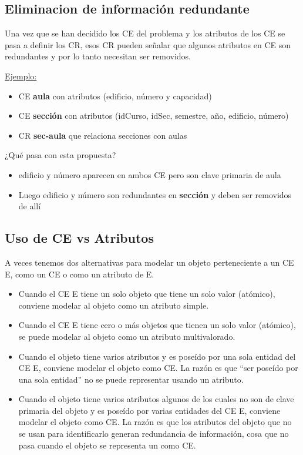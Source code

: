 \documentclass[12pt,a4paper]{report}
\begin{document}
		\subsection{Eliminacion de información redundante}
			Una vez que se han decidido los CE del problema y los atributos de los CE se pasa a definir los CR, esos CR pueden señalar que algunos atributos en CE son redundantes y por lo tanto necesitan ser removidos.
			\vspace{5mm}
			\par \underline{Ejemplo:}
			\begin{itemize}
				\item CE \textbf{aula} con atributos (edificio, número y capacidad)
				\item CE \textbf{sección} con atributos (idCurso, idSec, semestre, año, edificio, número)
				\item CR \textbf{sec-aula} que relaciona secciones con aulas
				\end{itemize}
				
				\par ¿Qué pasa con esta propuesta?
				\begin{itemize}
				\item edificio y número aparecen en ambos CE pero son clave primaria de aula
				\item Luego edificio y número son redundantes en \textbf{sección} y deben ser removidos de allí
				\end{itemize}	

		\subsection{Uso de CE vs Atributos}
			A veces tenemos dos alternativas para modelar un objeto perteneciente a un CE E, como un CE o como un atributo de E.
			\begin{itemize}
				\item Cuando el CE E tiene un solo objeto que tiene un solo valor (atómico), conviene modelar al objeto como un atributo simple.
				\item Cuando el CE E tiene cero o más objetos que tienen un solo valor (atómico), se puede modelar al objeto como un atributo multivalorado.
				
				\item Cuando el objeto tiene varios atributos y es poseído por una sola entidad del CE E, conviene modelar el objeto como CE. La razón es que “ser poseído por una sola entidad” no se puede representar usando un atributo.
				\item Cuando el objeto tiene varios atributos algunos de los cuales no son de clave primaria del objeto y es poseído por varias entidades del CE E, conviene modelar el objeto como CE. La razón es que los atributos del objeto que no se usan para identificarlo generan redundancia de información, cosa que no pasa cuando el objeto se representa un como CE.
			\end{itemize}
			
\end{document}
